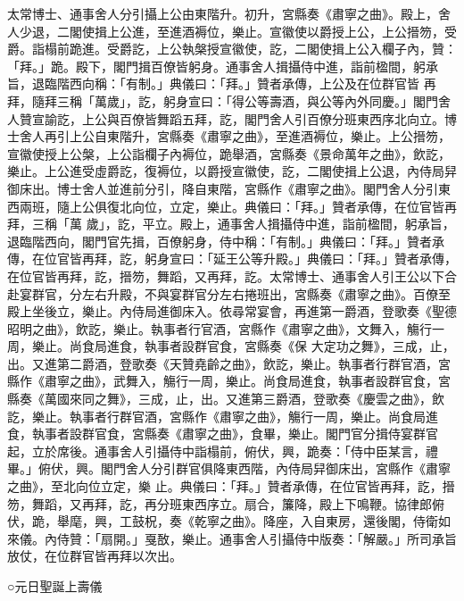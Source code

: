 \begin{pinyinscope}
 太常博士、通事舍人分引攝上公由東階升。初升，宮縣奏《肅寧之曲》。殿上，舍人少退，二閣使揖上公進，至進酒褥位，樂止。宣徽使以爵授上公，上公搢笏，受爵。詣榻前跪進。受爵訖，上公執槃授宣徽使，訖，二閣使揖上公入欄子內，贊：「拜。」跪。殿下，閣門揖百僚皆躬身。通事舍人揖攝侍中進，詣前楹間，躬承旨，退臨階西向稱：「有制。」典儀曰：「拜。」贊者承傳，上公及在位群官皆
 再拜，隨拜三稱「萬歲」，訖，躬身宣曰：「得公等壽酒，與公等內外同慶。」閣門舍人贊宣諭訖，上公與百僚皆舞蹈五拜，訖，閣門舍人引百僚分班東西序北向立。博士舍人再引上公自東階升，宮縣奏《肅寧之曲》，至進酒褥位，樂止。上公搢笏，宣徽使授上公槃，上公詣欄子內褥位，跪舉酒，宮縣奏《景命萬年之曲》，飲訖，樂止。上公進受虛爵訖，復褥位，以爵授宣徽使，訖，二閣使揖上公退，內侍局舁御床出。博士舍人並進前分引，降自東階，宮縣作《肅寧之曲》。閣門舍人分引東西兩班，隨上公俱復北向位，立定，樂止。典儀曰：「拜。」贊者承傳，在位官皆再拜，三稱「萬
 歲」，訖，平立。殿上，通事舍人揖攝侍中進，詣前楹間，躬承旨，退臨階西向，閣門官先揖，百僚躬身，侍中稱：「有制。」典儀曰：「拜。」贊者承傳，在位官皆再拜，訖，躬身宣曰：「延王公等升殿。」典儀曰：「拜。」贊者承傳，在位官皆再拜，訖，搢笏，舞蹈，又再拜，訖。太常博士、通事舍人引王公以下合赴宴群官，分左右升殿，不與宴群官分左右捲班出，宮縣奏《肅寧之曲》。百僚至殿上坐後立，樂止。內侍局進御床入。依尋常宴會，再進第一爵酒，登歌奏《聖德昭明之曲》，飲訖，樂止。執事者行官酒，宮縣作《肅寧之曲》，文舞入，觴行一周，樂止。尚食局進食，執事者設群官食，宮縣奏《保
 大定功之舞》，三成，止，出。又進第二爵酒，登歌奏《天贊堯齡之曲》，飲訖，樂止。執事者行群官酒，宮縣作《肅寧之曲》，武舞入，觴行一周，樂止。尚食局進食，執事者設群官食，宮縣奏《萬國來同之舞》，三成，止，出。又進第三爵酒，登歌奏《慶雲之曲》，飲訖，樂止。執事者行群官酒，宮縣作《肅寧之曲》，觴行一周，樂止。尚食局進食，執事者設群官食，宮縣奏《肅寧之曲》，食畢，樂止。閣門官分揖侍宴群官起，立於席後。通事舍人引攝侍中詣榻前，俯伏，興，跪奏：「侍中臣某言，禮畢。」俯伏，興。閣門舍人分引群官俱降東西階，內侍局舁御床出，宮縣作《肅寧之曲》，至北向位立定，樂
 止。典儀曰：「拜。」贊者承傳，在位官皆再拜，訖，搢笏，舞蹈，又再拜，訖，再分班東西序立。扇合，簾降，殿上下鳴鞭。協律郎俯伏，跪，舉麾，興，工鼓柷，奏《乾寧之曲》。降座，入自東房，還後閣，侍衛如來儀。內侍贊：「扇開。」戛敔，樂止。通事舍人引攝侍中版奏：「解嚴。」所司承旨放仗，在位群官皆再拜以次出。



 ○元日聖誕上壽儀




\end{pinyinscope}
